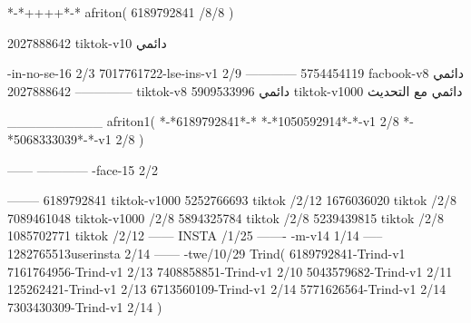 *-*++++*-*
afriton(
6189792841 /8/8
)

2027888642 tiktok-v10
دائمي

-in-no-se-16 2/3
7017761722-lse-ins-v1 2/9
------------
5754454119 facbook-v8
دائمي
--------------
2027888642 tiktok-v8
دائمي
5909533996 tiktok-v1000
دائمي مع التحديث

__________
afriton1(
*-*6189792841*-*
*-*1050592914*-*-v1 2/8
*-*5068333039*-*-v1 2/8
)

------
------------
-face-15 2/2

--------
6189792841 tiktok-v1000
5252766693 tiktok /2/12
1676036020 tiktok /2/8
7089461048 tiktok-v1000 /2/8
5894325784 tiktok /2/8
5239439815 tiktok /2/8
1085702771 tiktok /2/12
------
 INSTA /1/25
-------
-m-v14 1/14
-----
1282765513userinsta 2/14
------
-twe/10/29
Trind(
6189792841-Trind-v1 
7161764956-Trind-v1 2/13
7408858851-Trind-v1 2/10
5043579682-Trind-v1 2/11
125262421-Trind-v1 2/13
6713560109-Trind-v1 2/14
5771626564-Trind-v1 2/14
7303430309-Trind-v1 2/14
)
